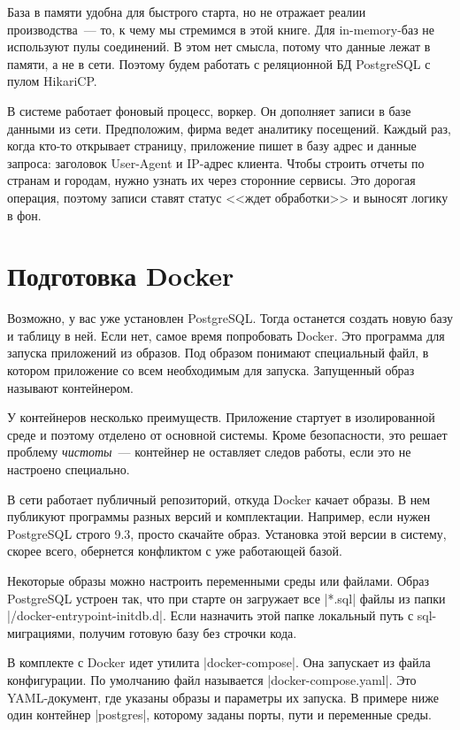 База в памяти удобна для быстрого старта, но не отражает реалии производства~---
то, к чему мы стремимся в этой книге. Для in-memory-баз не используют пулы
соединений. В этом нет смысла, потому что данные лежат в памяти, а не в
сети. Поэтому будем работать с реляционной БД PostgreSQL с пулом HikariCP.

В системе работает фоновый процесс, воркер. Он дополняет записи в базе данными
из сети. Предположим, фирма ведет аналитику посещений. Каждый раз, когда кто-то
открывает страницу, приложение пишет в базу адрес и данные запроса: заголовок
User-Agent и IP-адрес клиента. Чтобы строить отчеты по странам и городам, нужно
узнать их через сторонние сервисы. Это дорогая операция, поэтому записи ставят
статус <<ждет обработки>> и выносят логику в фон.

\section{Подготовка Docker}

Возможно, у вас уже установлен PostgreSQL. Тогда останется создать новую базу и
таблицу в ней. Если нет, самое время попробовать Docker. Это программа для
запуска приложений из образов. Под образом понимают специальный файл, в котором
приложение со всем необходимым для запуска. Запущенный образ называют
контейнером.

У контейнеров несколько преимуществ. Приложение стартует в изолированной среде и
поэтому отделено от основной системы. Кроме безопасности, это решает проблему
\emph{чистоты}~--- контейнер не оставляет следов работы, если это не настроено
специально.

В сети работает публичный репозиторий, откуда Docker качает образы. В нем
публикуют программы разных версий и комплектации. Например, если нужен
PostgreSQL строго 9.3, просто скачайте образ. Установка этой версии в систему,
скорее всего, обернется конфликтом с уже работающей базой.

Некоторые образы можно настроить переменными среды или файлами. Образ PostgreSQL
устроен так, что при старте он загружает все \spverb|*.sql| файлы из папки
\spverb|/docker-entrypoint-initdb.d|. Если назначить этой папке локальный путь с
sql-миграциями, получим готовую базу без строчки кода.

В комплекте с Docker идет утилита \spverb|docker-compose|. Она запускает из
файла конфигурации. По умолчанию файл называется
\spverb|docker-compose.yaml|. Это YAML-документ, где указаны образы и параметры
их запуска. В примере ниже один контейнер \spverb|postgres|, которому заданы
порты, пути и переменные среды.


